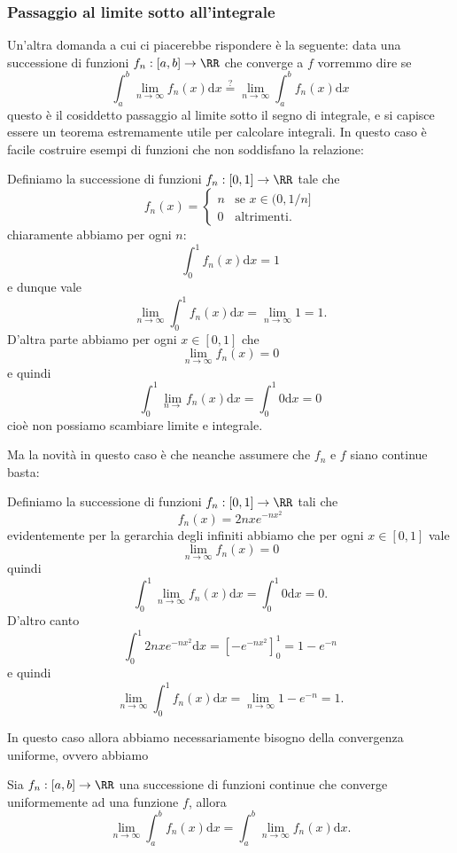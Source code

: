 \documentclass[11pt]{scrartcl}
\newcommand{\dif}{\text{d}}
\begin{document}
	\subsubsection{Passaggio al limite sotto all'integrale}
	Un'altra domanda a cui ci piacerebbe rispondere è la seguente: data una successione di funzioni $f_n:[a,b]\to\RR$ che converge a $f$ vorremmo dire se
	$$\int_a^b\lim_{n\to\infty}f_n(x)\dif x\overset{?}{=}\lim_{n\to\infty}\int_a^bf_n(x)\dif x$$
	questo è il cosiddetto passaggio al limite sotto il segno di integrale, e si capisce essere un teorema estremamente utile per calcolare integrali. In questo caso è facile costruire esempi di funzioni che non soddisfano la relazione:
	\begin{example}
		Definiamo la successione di funzioni $f_n:[0,1]\to\RR$ tale che
		$$f_n(x)=
		\begin{cases}
			n & \text{se $x\in (0,1/n]$} \\
			0 & \text{altrimenti.}
		\end{cases}
		$$
		chiaramente abbiamo per ogni $n$:
		$$\int_0^1f_n(x)\dif x=1$$
		e dunque vale
		$$\lim_{n\to\infty}\int_0^1f_n(x)\dif x=\lim_{n\to\infty}1=1.$$
		D'altra parte abbiamo per ogni $x\in [0,1]$ che
		$$\lim_{n\to\infty}f_n(x)=0$$
		e quindi
		$$\int_0^1\lim_{n\to}f_n(x)\dif x=\int_0^1 0 \dif x = 0$$
		cioè non possiamo scambiare limite e integrale.
	\end{example}
	Ma la novità in questo caso è che neanche assumere che $f_n$ e $f$ siano continue basta:
	\begin{example}
		Definiamo la successione di funzioni $f_n:[0,1]\to\RR$ tali che
		$$f_n(x)=2nxe^{-nx^2}$$
		evidentemente per la gerarchia degli infiniti abbiamo che per ogni $x\in [0,1]$ vale
		$$\lim_{n\to\infty}f_n(x)=0$$
		quindi
		$$\int_0^1\lim_{n\to\infty}f_n(x)\dif x=\int_0^1 0\dif x=0.$$
		D'altro canto
		$$\int_0^1 2nxe^{-nx^2}\dif x=\left[-e^{-nx^2}\right]^1_0=1-e^{-n}$$
		e quindi
		$$\lim_{n\to\infty}\int_0^1f_n(x)\dif x=\lim_{n\to\infty}1-e^{-n}=1.$$
	\end{example}
	In questo caso allora abbiamo necessariamente bisogno della convergenza uniforme, ovvero abbiamo
	\begin{theorem}
		Sia $f_n:[a,b]\to\RR$ una successione di funzioni continue che converge uniformemente ad una funzione $f$, allora 
		$$\lim_{n\to\infty}\int_a^b f_n(x)\dif x=\int_a^b\lim_{n\to\infty} f_n(x)\dif x.$$
	\end{theorem}
\end{document}
